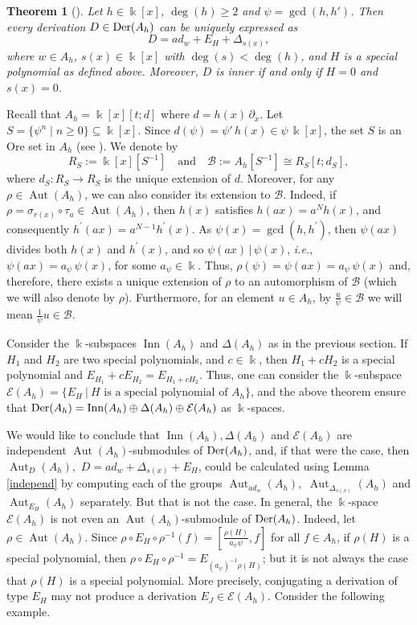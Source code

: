 \documentclass{article}
\numberwithin{equation}{section}\theoremstyle{plain}
\newtheorem{theorem}{Theorem}
\newcommand{\der}{{\rm Der}}
\DeclareMathOperator{\Aut}{Aut}
\DeclareMathOperator{\Inn}{Inn}
\begin{document}
\begin{theorem}[{\cite[Theorem 11.1]{Nowicki}}]
Let $h\in \Bbbk[x]$, $\deg(h) \ge 2$ and $\psi=\gcd(h,h')$. 
Then every derivation $D\in\der(A_h)$ can be uniquely expressed as
\[
D=ad_w+E_H+\Delta_{s(x)},
\]
where $w\in A_h$, $s(x)\in \Bbbk[x]$ with $\deg (s) <\deg (h)$, 
and $H$ is a special polynomial as defined above. Moreover, $D$ is inner if and only if $H=0$ and $s(x)=0$.
\end{theorem}

\medbreak 

Recall that $A_h = \Bbbk [x] [t ; d]$ where $d = h(x) \, \partial_x$.
Let $S=\{\psi^n \mid n\ge 0\}\subseteq \Bbbk[x]$. Since $d(\psi)=\psi' \, h(x) \in \psi \, \Bbbk[x]$, the set $S$ is an Ore set in $A_h$ (see \cite[Lemma 4.2]{BLO2015}).
We denote by
$$R_S:=\Bbbk[x][S^{-1}]
\quad\text{and}\quad
\mathcal B:=A_h[S^{-1}]\cong R_S[t;d_S],$$
where $d_S:R_S\to R_S$ is the unique extension of $d$.
Moreover, for any $\rho \in \Aut(A_h)$, we can also consider its extension to $\mathcal{B}$.
Indeed, if $\rho = \sigma_{r(x)} \circ \tau_a \in \Aut(A_h)$, then $h(x)$ satisfies $h(ax)=a^N h(x)$, and consequently $h^\prime(ax)=a^{N-1} h^\prime(x)$.
As $\psi(x) = \gcd(h,h^\prime)$, then $\psi(ax)$ divides both $h(x)$ and $h^\prime(x)$, and so $\psi(ax) \, | \, \psi(x)$, \emph{i.e.}, $\psi(ax) = a_\psi \, \psi(x)$, for some $a_\psi \in \Bbbk$.
Thus, $\rho(\psi)=\psi(ax)=a_\psi \, \psi(x)$ and, therefore, there exists a unique extension of $\rho$ to an automorphism of $\mathcal{B}$ (which we will also denote by $\rho$).
Furthermore, for an element $u \in A_h$, by $\frac{u}{\psi} \in \mathcal{B}$ we will mean $\frac{1}{\psi}u \in \mathcal{B}$.


\medbreak

Consider the $\Bbbk$-subspaces $\Inn(A_h)$ and $\Delta(A_h)$ as in the previous section.
If $H_1$ and $H_2$ are two special polynomials, and $c \in \Bbbk$, then $H_1 + c H_2$ is a special polynomial and $E_{H_1}+ c E_{H_2} = E_{H_1 + c H_2}$.
Thus, one can consider the $\Bbbk$-subspace $\mathcal{E}(A_h)= \{ E_H \ | \ \textrm{$H$ is a special polynomial of $A_h$} \}$, and the above theorem ensure that $\der(A_h) = \Inn(A_h) \oplus \Delta(A_h) \oplus \mathcal{E}(A_h)$ as $\Bbbk$-spaces.

We would like to conclude that $\Inn(A_h), \Delta(A_h)$ and $\mathcal{E}(A_h)$ are independent $\Aut(A_h)$-submodules of $\der(A_h)$, and, if that were the case, then $\Aut_D(A_h),$ $D=ad_w+\Delta_{s(x)}+E_H$, could be calculated using Lemma \ref{independ} by computing each of the groups $\Aut_{ad_w}(A_h),$ $\Aut_{\Delta_{s(x)}}(A_h)$ and $\Aut_{E_H}(A_h)$ separately.
But that is not the case. 
In general, the $\Bbbk$-space $\mathcal{E}(A_h)$ is not even an $\Aut(A_h)$-submodule of $\der(A_h)$.
Indeed, let $\rho \in \Aut(A_h)$.
Since $\rho \circ E_H \circ \rho^{-1} (f) = \left[ \tfrac{\rho(H)}{a_\psi \psi}, f \right]$ for all $f \in A_h$, if $\rho(H)$ is a special polynomial, then $\rho \circ E_H \circ \rho^{-1} = E_{(a_\psi)^{-1}\rho(H)}$;
but it is not always the case that $\rho(H)$ is a special polynomial.
More precisely, conjugating a derivation of type $E_H$ may not produce a derivation $E_J \in \mathcal{E}(A_h)$. 
Consider the following example.
\end{document}
